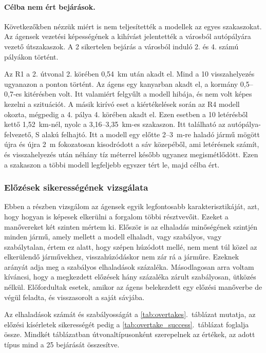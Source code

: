 \documentclass[a4paper,12pt,oneside]{article}
\begin{document}
\paragraph{Célba nem ért bejárások.} 

Következőkben nézzük miért is nem teljesítették a modellek az egyes szakaszokat. 
Az ágensek vezetési képességének a kihívást jelentették a városból autópályára 
vezető útszakaszok.
A 2 sikertelen bejárás a városból induló 2. és 4. számú pályákon történt.

Az R1 a 2. útvonal 2. körében 0,54~km után akadt el. Mind a 10 visszahelyezés ugyanazon a
ponton történt. Az ágens egy kanyarban akadt el, a kormány 0,5--0,7-es kitérésben volt. 
Itt valamiért felgyűlt a modell hibája, és nem volt képes kezelni a szituációt.
A másik kirívó eset a kiértékelések során az R4 modell okozta, mégpedig 
a 4. pálya 4. körében akadt el. Ezen esetben a 10 letérésből kettő 1,52~km-nél, 
nyolc a 3,16--3,35~km-es szakaszon.
Itt található az autópálya-felvezető, S alakú felhajtó. Itt a
modell egy előtte 2--3~m-re haladó jármű mögött újra és újra 2~m fokozatosan kisodródott a
sáv közepéből, ami letérésnek számít, és visszahelyezés után néhány tíz méterrel később ugyanez
megismétlődött. Ezen a szakaszon a többi modell legfeljebb egyszer tért le, majd célba ért.

\subsubsection{Előzések sikerességének vizsgálata}

Ebben a részben vizsgálom az ágensek egyik legfontosabb karakterisztikáját, azt, hogy hogyan 
is képesek elkerülni a forgalom többi résztvevőit.
Ezeket a manővereket két szinten mértem ki. 
Először is az elhaladás minőségének szintjén minden jármű, amely mellett a modell
elhaladt, vagy szabályos, vagy szabálytalan, értem ez alatt, hogy szépen húzódott mellé, nem ment 
túl közel az elkerülendő járművekhez, visszahúzódáskor nem zár rá a járműre. 
Ezeknek arányát adja meg a szabályos elhaladások százaléka. 
Másodlagosan arra voltam kíváncsi, hogy a megkezdett előzések hány százaléka zárult
szabályosan, ütközés nélkül. Előfordultak esetek, amikor az ágens belekezdett egy előzési manőverbe 
de végül feladta, és visszasorolt a saját sávjába.

Az elhaladások számát és szabályosságát a \ref{tab:overtakes}.~táblázat mutatja, 
az előzési kísérletek sikerességét pedig a \ref{tab:overtake_success}.~táblázat foglalja össze.
Mindkét táblázatban útvonaltípusonként szerepelnek az értékek, az adott típus mind a 25
bejárását összesítve.
\end{document}
